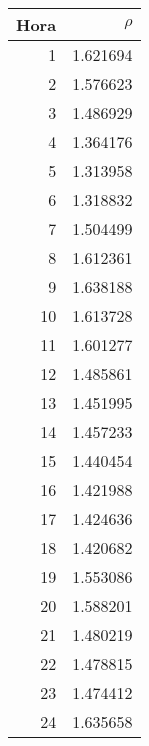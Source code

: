 \begin{tabular}{rr}
\toprule
Hora & $\rho$ \\
\midrule
1 & 1.621694 \\
2 & 1.576623 \\
3 & 1.486929 \\
4 & 1.364176 \\
5 & 1.313958 \\
6 & 1.318832 \\
7 & 1.504499 \\
8 & 1.612361 \\
9 & 1.638188 \\
10 & 1.613728 \\
11 & 1.601277 \\
12 & 1.485861 \\
13 & 1.451995 \\
14 & 1.457233 \\
15 & 1.440454 \\
16 & 1.421988 \\
17 & 1.424636 \\
18 & 1.420682 \\
19 & 1.553086 \\
20 & 1.588201 \\
21 & 1.480219 \\
22 & 1.478815 \\
23 & 1.474412 \\
24 & 1.635658 \\
\bottomrule
\end{tabular}
